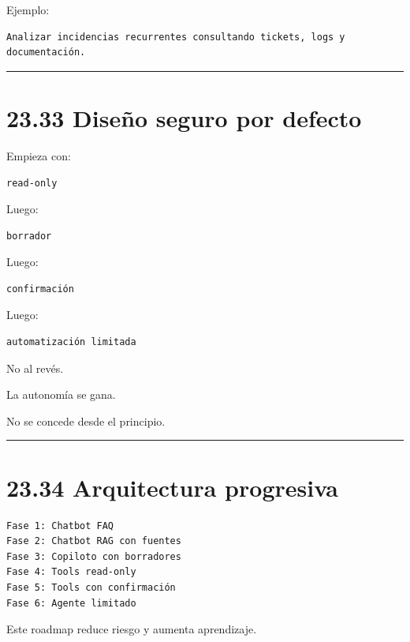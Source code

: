 Ejemplo:

\begin{lstlisting}
Analizar incidencias recurrentes consultando tickets, logs y documentación.
\end{lstlisting}

\begin{center}\rule{0.5\linewidth}{0.5pt}\end{center}

\section{23.33 Diseño seguro por
defecto}\label{diseuxf1o-seguro-por-defecto}

Empieza con:

\begin{lstlisting}
read-only
\end{lstlisting}

Luego:

\begin{lstlisting}
borrador
\end{lstlisting}

Luego:

\begin{lstlisting}
confirmación
\end{lstlisting}

Luego:

\begin{lstlisting}
automatización limitada
\end{lstlisting}

No al revés.

La autonomía se gana.

No se concede desde el principio.

\begin{center}\rule{0.5\linewidth}{0.5pt}\end{center}

\section{23.34 Arquitectura progresiva}\label{arquitectura-progresiva}

\begin{lstlisting}
Fase 1: Chatbot FAQ
Fase 2: Chatbot RAG con fuentes
Fase 3: Copiloto con borradores
Fase 4: Tools read-only
Fase 5: Tools con confirmación
Fase 6: Agente limitado
\end{lstlisting}

Este roadmap reduce riesgo y aumenta aprendizaje.

